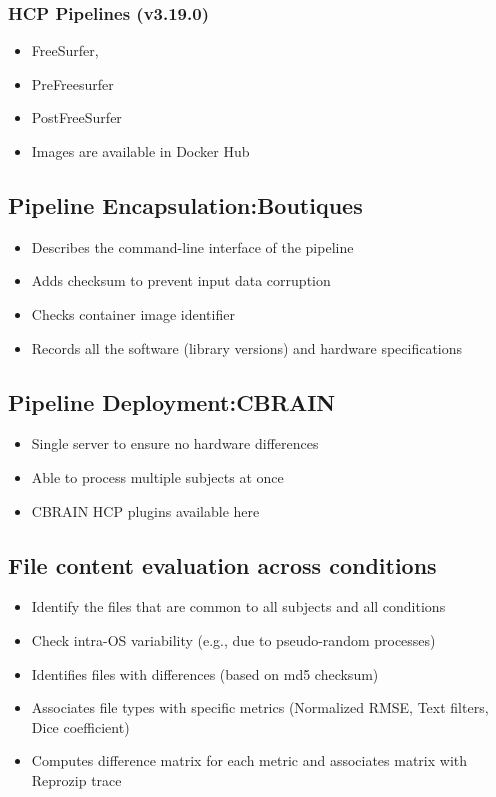 \subsubsection{HCP Pipelines (v3.19.0)}
\begin{itemize}
  \item FreeSurfer,
  \item PreFreesurfer
  \item PostFreeSurfer
  \item Images are available in Docker Hub
\end{itemize}

\subsection{Pipeline Encapsulation:Boutiques}
\begin{itemize}
  \item Describes the command-line interface of the pipeline
  \item Adds checksum to prevent input data corruption
  \item Checks container image identifier
  \item Records all the software (library versions) and hardware specifications
\end{itemize}


\subsection{Pipeline Deployment:CBRAIN}
\begin{itemize}
  \item Single server to ensure no hardware differences
  \item Able to process multiple subjects at once
  \item CBRAIN HCP plugins available here
\end{itemize}

\subsection{File content evaluation across conditions}
\begin{itemize}
 \item Identify the files that are common to all subjects and all conditions
 \item Check intra-OS variability (e.g., due to pseudo-random processes)
 \item Identifies files with differences (based on md5 checksum)
 \item Associates file types with specific metrics (Normalized RMSE, Text filters, Dice coefficient)
 \item Computes difference matrix for each metric and associates matrix with Reprozip trace
\end{itemize}

